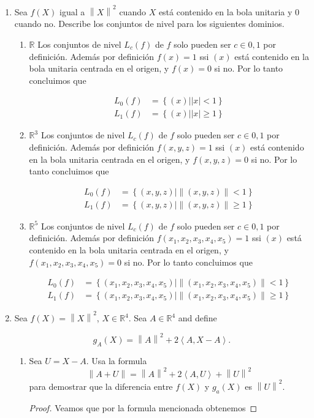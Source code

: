 \documentclass[letterpaper]{article}
\theoremstyle{definition}
\theoremstyle{lemathm}
\theoremstyle{lemathm}
\theoremstyle{lemathm}
\theoremstyle{lemademthm}
\newcommand{\abs}[1]{\left| #1 \right| }
\newcommand{\pars}[1]{\left( #1 \right) }
\newcommand{\inprod}[1]{\left\langle #1 \right\rangle }
\newcommand{\norm}[1]{\left\lVert#1\right\rVert}
\newcommand{\set}[1]{\left \{ #1 \right\} }
\newcommand{\RR}{\mathbb{R}}
\newcommand{\1}{\mathbbm{1}}
\begin{document}
\begin{enumerate}
		\item Sea $f(X)$ igual a $\norm{X}^2$ cuando $X$ está contenido en la bola unitaria y $0$ cuando no. Describe los conjuntos de nivel para los siguientes dominios.
		
		\begin{enumerate}
			\item $\RR$
			Los conjuntos de nivel $L_c(f)$ de $f$ solo pueden ser $c \in {0,1}$ por definición. Además por definición $f(x) = 1$ ssi $(x)$ está contenido en la bola unitaria centrada en el origen, y $f(x) = 0$ si no. Por lo tanto concluimos que

			\begin{align*}
				L_0(f) &= \set{\pars{x} | \abs{x}<1}\\
				L_1(f) &= \set{\pars{x} | \abs{x}\geq 1}
			\end{align*}

			\item $\RR^3$
			Los conjuntos de nivel $L_c(f)$ de $f$ solo pueden ser $c \in {0,1}$ por definición. Además por definición $f(x,y,z) = 1$ ssi $(x)$ está contenido en la bola unitaria centrada en el origen, y $f(x,y,z) = 0$ si no. Por lo tanto concluimos que

			\begin{align*}
				L_0(f) &= \set{\pars{x,y,z} | \norm{\pars{x,y,z}}<1}\\
				L_1(f) &= \set{\pars{x,y,z} | \norm{\pars{x,y,z}}\geq 1}
			\end{align*}

			\item $\RR^5$
			Los conjuntos de nivel $L_c(f)$ de $f$ solo pueden ser $c \in {0,1}$ por definición. Además por definición $f(x_1,x_2,x_3,x_4,x_5) = 1$ ssi $(x)$ está contenido en la bola unitaria centrada en el origen, y $f(x_1,x_2,x_3,x_4,x_5) = 0$ si no. Por lo tanto concluimos que

			\begin{align*}
				L_0(f) &= \set{\pars{x_1,x_2,x_3,x_4,x_5} | \norm{\pars{x_1,x_2,x_3,x_4,x_5}}<1}\\
				L_1(f) &= \set{\pars{x_1,x_2,x_3,x_4,x_5} | \norm{\pars{x_1,x_2,x_3,x_4,x_5}}\geq 1}
			\end{align*}
		\end{enumerate}
		\item Sea $f(X) = \norm{X}^2$, $X\in \RR^4$. Sea $A\in \RR^4$ and define
		
		\[g_A(X) = \norm{A}^2 + 2\inprod{A,X-A}.\]

		\begin{enumerate}
			\item Sea $U=X-A$. Usa la formula
			\[\norm{A+U}=\norm{A}^2+2\inprod{A,U}+\norm{U}^2\]
			para demostrar que la diferencia entre $f(X)$ y $g_a(X)$ es $\norm{U}^2$.
			\begin{proof}
				Veamos que por la formula mencionada obtenemos


\end{proof}
\end{enumerate}
\end{enumerate}
\end{document}
